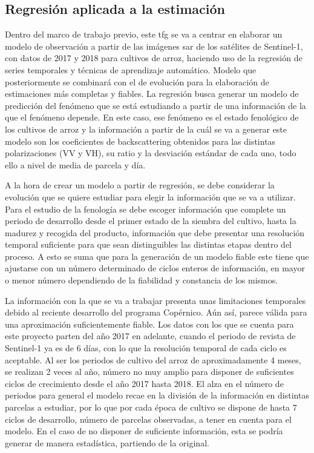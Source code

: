 \subsection{Regresión aplicada a la estimación}
\par Dentro del marco de trabajo previo, este \gls{tfg} se va a centrar en elaborar un modelo de observación a partir de las imágenes \gls{sar} de los satélites de Sentinel-1, con datos de 2017 y 2018 para cultivos de arroz, haciendo uso de la regresión de series temporales y técnicas de aprendizaje automático. Modelo que posteriormente se combinará con el de evolución para la elaboración de estimaciones más completas y fiables. La regresión busca generar un modelo de predicción del fenómeno que se está estudiando a partir de una información de la que el fenómeno depende. En este caso, ese fenómeno es el estado fenológico de los cultivos de arroz y la información a partir de la cuál se va a generar este modelo son los coeficientes de backscattering obtenidos para las distintas polarizaciones (VV y VH), su ratio y la desviación estándar de cada uno, todo ello a nivel de media de parcela y día.
\\
\par A la hora de crear un modelo a partir de regresión, se debe considerar la evolución que se quiere estudiar para elegir la información que se va a utilizar. Para el estudio de la fenología se debe escoger información que complete un periodo de desarrollo desde el primer estado de la siembra del cultivo, hasta la madurez y recogida del producto, información que debe presentar una resolución temporal suficiente para que sean distinguibles las distintas etapas dentro del proceso. A esto se suma que para la generación de un modelo fiable este tiene que ajustarse con un número determinado de ciclos enteros de información, en mayor o menor número dependiendo de la fiabilidad y constancia de los mismos. 
\\
\par La información con la que se va a trabajar presenta unas limitaciones temporales debido al reciente desarrollo del programa Copérnico. Aún así, parece válida para una aproximación suficientemente fiable. Los datos con los que se cuenta para este proyecto parten del año 2017 en adelante, cuando el periodo de revista de Sentinel-1 ya es de 6 días, con lo que la resolución temporal de cada ciclo es aceptable. Al ser los periodos de cultivo del arroz de aproximadamente 4 meses, se realizan 2 veces al año, número no muy amplio para disponer de suficientes ciclos de crecimiento desde el año 2017 hasta 2018. El alza en el número de periodos para general el modelo recae en la división de la información en distintas parcelas a estudiar, por lo que por cada época de cultivo se dispone de hasta 7 ciclos de desarrollo, número de parcelas observadas, a tener en cuenta para el modelo. En el caso de no disponer de suficiente información, esta se podría generar de manera estadística, partiendo de la original. 
